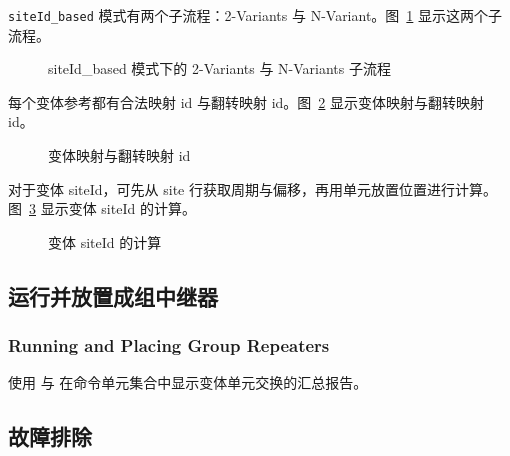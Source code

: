 \texttt{siteId\_based} 模式有两个子流程：2-Variants 与 N-Variant。图~\ref{fig:fc-var-subflow} 显示这两个子流程。

\begin{figure}[htbp]
\centering
{}
\caption{siteId\_based 模式下的 2-Variants 与 N-Variants 子流程}
\label{fig:fc-var-subflow}
\end{figure}

每个变体参考都有合法映射 id 与翻转映射 id。图~\ref{fig:fc-var-mapflip} 显示变体映射与翻转映射 id。

\begin{figure}[htbp]
\centering
{}
\caption{变体映射与翻转映射 id}
\label{fig:fc-var-mapflip}
\end{figure}

对于变体 siteId，可先从 site 行获取周期与偏移，再用单元放置位置进行计算。图~\ref{fig:fc-var-siteid} 显示变体 siteId 的计算。

\begin{figure}[htbp]
\centering
{}
\caption{变体 siteId 的计算}
\label{fig:fc-var-siteid}
\end{figure}

\subsection{运行并放置成组中继器}
\subsubsection*{Running and Placing Group Repeaters}

使用  与  在命令单元集合中显示变体单元交换的汇总报告。

\subsection{故障排除}
